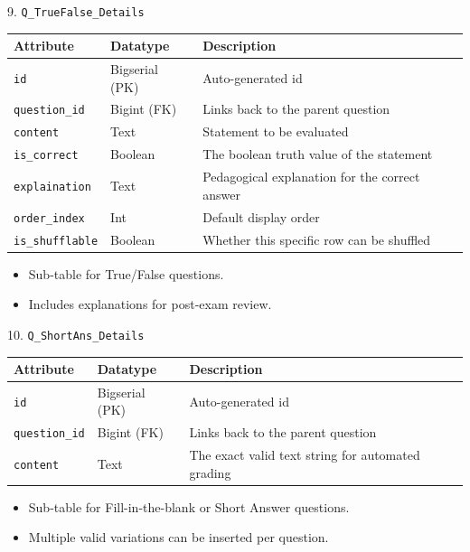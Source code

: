 \documentclass[aspectratio=169, 10pt]{beamer}
\begin{document}
\begin{frame}{9. \texttt{Q\_TrueFalse\_Details}}
    \centering
    \small
    \begin{tabular}{|l|l|p{8cm}|}
        \hline
        \textbf{Attribute} & \textbf{Datatype} & \textbf{Description} \\ \hline
        \texttt{id} & Bigserial (PK) & Auto-generated id\\ \hline
        \texttt{question\_id} & Bigint (FK) & Links back to the parent question\\ \hline
        \texttt{content} & Text & Statement to be evaluated\\ \hline
        \texttt{is\_correct} & Boolean & The boolean truth value of the statement\\ \hline
        \texttt{explaination} & Text & Pedagogical explanation for the correct answer\\ \hline
        \texttt{order\_index} & Int & Default display order\\ \hline
        \texttt{is\_shufflable} & Boolean & Whether this specific row can be shuffled\\\hline
    \end{tabular}
    \vspace{0.3cm}
    \begin{itemize}
        \item Sub-table for True/False questions.
        \item Includes explanations for post-exam review.
    \end{itemize}
\end{frame}


\begin{frame}{10. \texttt{Q\_ShortAns\_Details}}
    \centering
    \small
    \begin{tabular}{|l|l|p{8cm}|}
        \hline
        \textbf{Attribute} & \textbf{Datatype} & \textbf{Description} \\ \hline
        \texttt{id} & Bigserial (PK) & Auto-generated id\\ \hline
        \texttt{question\_id} & Bigint (FK) & Links back to the parent question\\ \hline
        \texttt{content} & Text & The exact valid text string for automated grading\\ \hline
    \end{tabular}
    \vspace{0.3cm}
    \begin{itemize}
        \item Sub-table for Fill-in-the-blank or Short Answer questions.
        \item Multiple valid variations can be inserted per question.
    \end{itemize}
\end{frame}
\end{document}
